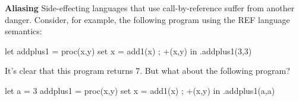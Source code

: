 \begin{minipage}[t]{\sw}
\slidenumber
\LARGE
{\bf Aliasing}\exx
Side-effecting languages that use call-by-reference
suffer from another danger.
Consider, for example, the following program using the REF language semantics:
\begin{qv}
let
  addplus1 = proc(x,y) {set x = add1(x) ; +(x,y)}
in
  .addplus1(3,3)
\end{qv}
It's clear that this program returns 7.
But what about the following program?
\begin{qv}
let
  a = 3
  addplus1 = proc(x,y) {set x = add1(x) ; +(x,y)}
in
  .addplus1(a,a)
\end{qv}
\end{minipage}
